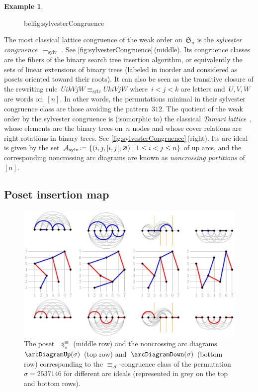 \documentclass{amsart}
\theoremstyle{definition}
\newtheorem{example}[theorem]{Example}
\newcommand{\f}[1]{{\mathfrak{#1}}} %
\newcommand{\set}[2]{\left\{ #1 \;\middle|\; #2 \right\}} %
\newcommand{\eqdef}{\mbox{\,\raisebox{0.2ex}{\scriptsize\ensuremath{\mathrm:}}\ensuremath{=}\,}} %
\newcommand{\darkblue}{\color{darkblue}} %
\newcommand{\defn}[1]{\textsl{\darkblue #1}} %
\newcommand{\arcs}{{\mathcal{A}}} %
\begin{document}
\begin{example}
\begin{figure}[b]
bel{fig:sylvesterCongruence}
\end{figure}
%
The most classical lattice congruence of the weak order on~$\f{S}_n$ is the \defn{sylvester congruence}~$\equiv_\textrm{sylv}$ \cite{LodayRonco, HivertNovelliThibon-algebraBinarySearchTrees}.
See \cref{fig:sylvesterCongruence}\,(middle).
Its congruence classes are the fibers of the binary search tree insertion algorithm, or equivalently the sets of linear extensions of binary trees (labeled in inorder and considered as posets oriented toward their roots).
It can also be seen as the transitive closure of the rewriting rule~$U i k V j W \equiv_\textrm{sylv} U k i V j W$ where~$i < j < k$ are letters and~$U,V,W$ are words on~$[n]$.
In other words, the permutations minimal in their sylvester congruence class are those avoiding the pattern~$312$.
The quotient of the weak order by the sylvester congruence is (isomorphic to) the classical \defn{Tamari lattice}~\cite{Tamari}, whose elements are the binary trees on~$n$ nodes and whose cover relations are right rotations in binary trees.
See \cref{fig:sylvesterCongruence}\,(right).
Its arc ideal is given by the set~$\arcs_\textrm{sylv} \eqdef \set{(i, j, {]i,j[}, \varnothing)}{1 \le i < j \le n}$ of up arcs, and the corresponding noncrossing arc diagrams are known as \defn{noncrossing partitions} of~$[n]$.
\end{example}


\subsection{Poset insertion map}
\label{subsec:insertionMap}

\begin{figure}[b]
	\capstart
	\centerline{\includegraphics[scale=.85]{arcDiagramsQuotients}}
	\caption{The poset~$\preccurlyeq_\sigma^\equiv$ (middle row) and the noncrossing arc diagrams~$\arcDiagramUp(\sigma)$ (top row) and~$\arcDiagramDown(\sigma)$ (bottom row) corresponding to the $\equiv_\arcs$-congruence class of the permutation~$\sigma = 2537146$ for different arc ideals (represented in grey on the top and bottom rows).}
	\label{fig:arcDiagramsQuotients}
\end{figure}
\end{document}
